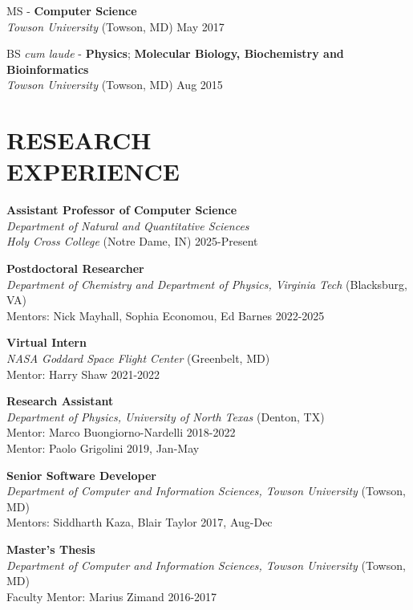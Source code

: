 \documentclass[marginmode, 10pt]{res} %
\begin{document}
\begin{resume}
MS - \textbf{Computer Science} \\
\textit{Towson University} (Towson, MD) \hfill May 2017

BS \textit{cum laude} - \textbf{Physics}; \textbf{Molecular Biology, Biochemistry and Bioinformatics} \\
\textit{Towson University} (Towson, MD) \hfill Aug 2015


\section{\small{RESEARCH\\EXPERIENCE}}

\textbf{Assistant Professor of Computer Science} \\
\textit{Department of Natural and Quantitative Sciences} \\
\textit{Holy Cross College} (Notre Dame, IN) \hfill 2025-Present

\textbf{Postdoctoral Researcher} \\
\textit{Department of Chemistry and Department of Physics, Virginia Tech} (Blacksburg, VA) \\
Mentors: Nick Mayhall, Sophia Economou, Ed Barnes \hfill 2022-2025

\textbf{Virtual Intern} \\
\textit{NASA Goddard Space Flight Center} (Greenbelt, MD) \\
Mentor: Harry Shaw \hfill 2021-2022

\textbf{Research Assistant} \\
\textit{Department of Physics, University of North Texas} (Denton, TX) \\
Mentor: Marco Buongiorno-Nardelli \hfill 2018-2022 \\
Mentor: Paolo Grigolini \hfill 2019, Jan-May

\textbf{Senior Software Developer} \\
\textit{Department of Computer and Information Sciences, Towson University} (Towson, MD) \\
Mentors: Siddharth Kaza, Blair Taylor \hfill 2017, Aug-Dec

\textbf{Master's Thesis} \\
\textit{Department of Computer and Information Sciences, Towson University} (Towson, MD) \\
Faculty Mentor: Marius Zimand \hfill 2016-2017


\end{resume}
\end{document}
